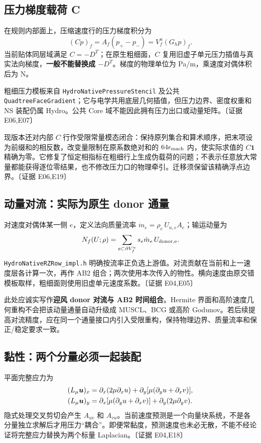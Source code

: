 \documentclass[UTF8,a4paper,11pt,fontset=fandol]{ctexart}
\newcommand{\code}[1]{\nolinkurl{#1}}
\newcommand{\ev}[1]{{\small\color{muted}〔证据 #1〕}}
\begin{document}
\subsection{压力梯度载荷 C}
在规则内部面上，压缩速度行的压力梯度积分为
\[
 (Cp)_f=A_f(p_{+}-p_{-})=V_f^u(G_hp)_f.
\]
当前贴体同层域满足 $C=-D^T$；在原生粗细面，$C$ 复用旧虚子单元压力插值与真实法向梯度，\textbf{一般不能替换成 $-D^T$}。梯度的物理单位为 Pa/m，乘速度对偶体积后为 N。

粗细压力模板来自 \code{HydroNativePressureStencil} 及公共 \code{QuadtreeFaceGradient}；它与电学共用底层几何插值，但压力边界、密度权重和 NS 装配仍属 Hydro。公共 Core 域不能因此拥有压力出口或动量矩阵。\ev{E06,E07}

现版本还对内部 $C$ 行作受限常量模态闭合：保持原列集合和算术顺序，把末项设为前缀和的相反数，改变量限制在原系数绝对和的 $64\epsilon_{\rm mach}$ 内，使实际求值的 $C\bm1$ 精确为零。它修复了恒定相指标在粗细行上生成伪载荷的问题；不表示任意放大常量都能获得逐位零结果，也不修改压力口的物理牵引。迁移须保留该精确浮点边界。\ev{E06,E19}

\subsection{动量对流：实际为原生 donor 通量}
对速度对偶体某一侧 $e$，定义法向质量流率 $\dot m_e=\rho_e\,U_{n,e}A_e$；输运动量为
\begin{equation}
 N_f(U;\rho)=\sum_{e\subset\partial V_f^u}s_e\dot m_e\,U_{\rm donor,e}.
 \label{eq:advection}
\end{equation}
\code{HydroNativeRZRow_impl.h} 明确按流率正负选上游值。对流贡献在当前和上一速度层各计算一次，再作 AB2 组合；两次使用本次传入的物性。横向速度由原交错模板取样，粗细面则使用旧虚单元速度系数。\ev{E04,E05}

此处应诚实写作\textbf{迎风 donor 对流与 AB2 时间组合}。Hermite 界面和高阶速度几何重构不会把该动量通量自动升级成 MUSCL、BCG 或高阶 Godunov。若后续提高对流精度，应在同一个通量接口内引入受限重构，保持物理边界、质量流率和保正/稳定要求一致。

\subsection{黏性：两个分量必须一起装配}
平面完整应力为
\begin{align*}
 (L_\mu\bm u)_x&=\partial_x(2\mu\partial_xu)
    +\partial_y[\mu(\partial_yu+\partial_xv)],\\
 (L_\mu\bm u)_y&=\partial_x[\mu(\partial_yu+\partial_xv)]
    +\partial_y(2\mu\partial_yv).
\end{align*}
隐式处理交叉剪切会产生 $A_{uv}$ 和 $A_{vu}$。当前速度预测是一个向量块系统，不是各分量独立求解后才用压力“耦合”。即便常黏度，预测速度也未必无散，不能不经论证将完整应力替换为两个标量 Laplacian。\ev{E04,E18}
\end{document}
